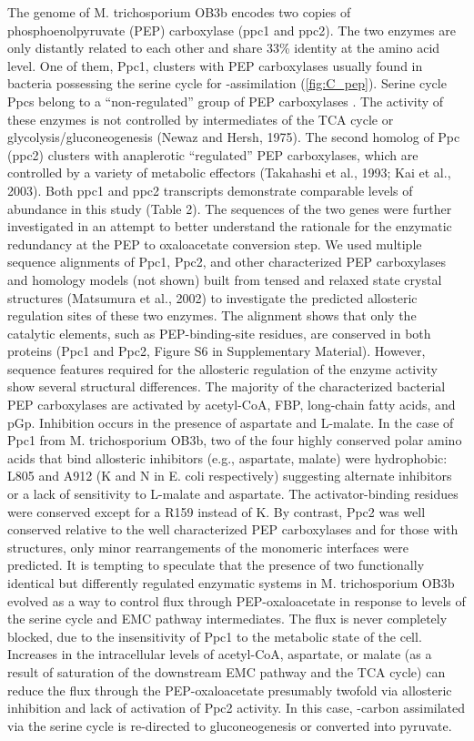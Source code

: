 The genome of M. trichosporium OB3b encodes two copies of phosphoenolpyruvate (PEP) carboxylase (ppc1 and ppc2).
The two enzymes are only distantly related to each other and share 33\% identity at the amino acid level.
One of them, Ppc1, clusters with PEP carboxylases usually found in bacteria possessing the serine cycle for -assimilation (\ref{fig:C_pep}).
Serine cycle Ppcs belong to a “non-regulated” group of PEP carboxylases \cite{anthony1982}.
The activity of these enzymes is not controlled by intermediates of the TCA cycle or glycolysis/gluconeogenesis (Newaz and Hersh, 1975).
The second homolog of Ppc (ppc2) clusters with anaplerotic “regulated” PEP carboxylases, which are controlled by a variety of metabolic effectors (Takahashi et al., 1993; Kai et al., 2003).
Both ppc1 and ppc2 transcripts demonstrate comparable levels of abundance in this study (Table 2).
The sequences of the two genes were further investigated in an attempt to better understand the rationale for the enzymatic redundancy at the PEP to oxaloacetate conversion step.
We used multiple sequence alignments of Ppc1, Ppc2, and other characterized PEP carboxylases and homology models (not shown) built from tensed and relaxed state crystal structures (Matsumura et al., 2002) to investigate the predicted allosteric regulation sites of these two enzymes.
The alignment shows that only the catalytic elements, such as PEP-binding-site residues, are conserved in both proteins (Ppc1 and Ppc2, Figure S6 in Supplementary Material).
However, sequence features required for the allosteric regulation of the enzyme activity show several structural differences.
The majority of the characterized bacterial PEP carboxylases are activated by acetyl-CoA, FBP, long-chain fatty acids, and pGp.
Inhibition occurs in the presence of aspartate and L-malate.
In the case of Ppc1 from M. trichosporium OB3b, two of the four highly conserved polar amino acids that bind allosteric inhibitors (e.g., aspartate, malate) were hydrophobic: L805 and A912 (K and N in E. coli respectively) suggesting alternate inhibitors or a lack of sensitivity to L-malate and aspartate.
The activator-binding residues were conserved except for a R159 instead of K.
By contrast, Ppc2 was well conserved relative to the well characterized PEP carboxylases and for those with structures, only minor rearrangements of the monomeric interfaces were predicted.
It is tempting to speculate that the presence of two functionally identical but differently regulated enzymatic systems in M. trichosporium OB3b evolved as a way to control flux through PEP-oxaloacetate in response to levels of the serine cycle and EMC pathway intermediates.
The flux is never completely blocked, due to the insensitivity of Ppc1 to the metabolic state of the cell.
Increases in the intracellular levels of acetyl-CoA, aspartate, or malate (as a result of saturation of the downstream EMC pathway and the TCA cycle) can reduce the flux through the PEP-oxaloacetate presumably twofold via allosteric inhibition and lack of activation of Ppc2 activity.
In this case, -carbon assimilated via the serine cycle is re-directed to gluconeogenesis or converted into pyruvate.

